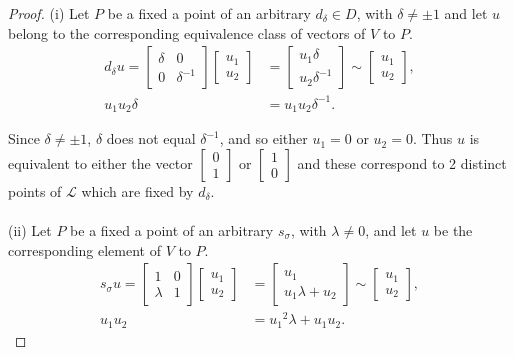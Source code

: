 \begin{proof} 
(i) Let $P$ be a fixed a point of an arbitrary $d_\delta \in D$, with $\delta \neq \pm 1$ and let $u$ belong to the corresponding equivalence class of vectors of $V$ to $P$. \\
\begin{align*} d_\delta u = \begin{bmatrix} \delta & 0 \\ 0 & \delta^{-1} \end{bmatrix} \begin{bmatrix} u_1 \\ u_2 \end{bmatrix} &= \begin{bmatrix} u_1 \delta \\ u_2 \delta^{-1} \end{bmatrix} \sim \begin{bmatrix} u_1 \\ u_2 \end{bmatrix}, 
\\[1.5ex] u_1 u_2 \delta &= u_1 u_2 \delta^{-1}.
\end{align*}

Since $\delta \neq \pm 1$, $\delta$ does not equal $\delta^{-1}$, and so either $u_1 = 0$ or $u_2 = 0$. Thus $u$ is equivalent to either the vector $\begin{bmatrix} 0 \\ 1 \end{bmatrix}$ or $\begin{bmatrix} 1 \\ 0 \end{bmatrix}$ and these correspond to 2 distinct points of $\mathscr{L}$ which are fixed by $d_\delta$. \\
\\
(ii) Let $P$ be a fixed a point of an arbitrary $s_\sigma$, with $\lambda \neq 0$, and let $u$ be the corresponding element of $V$ to $P$. \\
\begin{align*} s_\sigma u = \begin{bmatrix} 1 & 0 \\ \lambda & 1 \end{bmatrix} \begin{bmatrix} u_1 \\ u_2 \end{bmatrix} &= \begin{bmatrix} u_1 \\ u_1 \lambda + u_2 \end{bmatrix} \sim \begin{bmatrix} u_1 \\ u_2 \end{bmatrix}, 
\\[1.5ex] u_1 u_2 &= {u_1}^2 \lambda + u_1 u_2.
\end{align*}


\end{proof}
